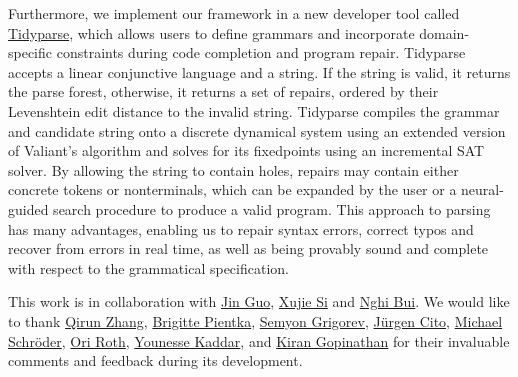 \documentclass[11pt]{article}
\begin{document}
Furthermore, we implement our framework in a new developer tool called \href{https://github.com/tidyparse/tidyparse}{Tidyparse}, which allows users to define grammars and incorporate domain-specific constraints during code completion and program repair. Tidyparse accepts a linear conjunctive language and a string. If the string is valid, it returns the parse forest, otherwise, it returns a set of repairs, ordered by their Levenshtein edit distance to the invalid string. Tidyparse compiles the grammar and candidate string onto a discrete dynamical system using an extended version of Valiant's algorithm and solves for its fixedpoints using an incremental SAT solver. By allowing the string to contain holes, repairs may contain either concrete tokens or nonterminals, which can be expanded by the user or a neural-guided search procedure to produce a valid program. This approach to parsing has many advantages, enabling us to repair syntax errors, correct typos and recover from errors in real time, as well as being provably sound and complete with respect to the grammatical specification.



This work is in collaboration with \href{https://www.cs.mcgill.ca/~jguo/}{Jin Guo}, \href{https://www.cs.toronto.edu/~six/}{Xujie Si} and \href{https://bdqnghi.github.io/}{Nghi Bui}. We would like to thank \href{https://helloqirun.github.io/}{Qirun Zhang}, \href{https://www.cs.mcgill.ca/~bpientka/}{Brigitte Pientka}, \href{https://yaccconstructor.github.io/}{Semyon Grigorev}, \href{https://people.csail.mit.edu/jcito/}{J\"urgen Cito}, \href{https://mcschroeder.github.io/}{Michael Schr\"oder},
 \href{https://oriroth.github.io/}{Ori Roth}, \href{https://younesse.net/}{Younesse Kaddar},
 and \href{https://gopiandcode.uk/}{Kiran Gopinathan} for their invaluable comments and feedback during its development.
\end{document}

